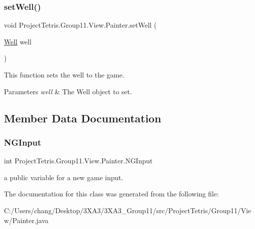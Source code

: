 \subsubsection{\texorpdfstring{set\+Well()}{setWell()}}
{\footnotesize\ttfamily void Project\+Tetris.\+Group11.\+View.\+Painter.\+set\+Well (\begin{DoxyParamCaption}\item[{\hyperlink{class_project_tetris_1_1_group11_1_1_model_1_1_well}{Well}}]{well }\end{DoxyParamCaption})}



This function sets the well to the game. 


\begin{DoxyParams}{Parameters}
{\em well} & The Well object to set. \\
\hline
\end{DoxyParams}


\subsection{Member Data Documentation}
\hypertarget{class_project_tetris_1_1_group11_1_1_view_1_1_painter_ae72e4845df48232ad82e76f0f2f3fa77}{}\label{class_project_tetris_1_1_group11_1_1_view_1_1_painter_ae72e4845df48232ad82e76f0f2f3fa77} 
\subsubsection{\texorpdfstring{N\+G\+Input}{NGInput}}
{\footnotesize\ttfamily int Project\+Tetris.\+Group11.\+View.\+Painter.\+N\+G\+Input}

a public variable for a new game input. 

The documentation for this class was generated from the following file\+:\begin{DoxyCompactItemize}
\item 
C\+:/\+Users/chang/\+Desktop/3\+X\+A3/3\+X\+A3\+\_\+\+Group11/src/\+Project\+Tetris/\+Group11/\+View/Painter.\+java\end{DoxyCompactItemize}
